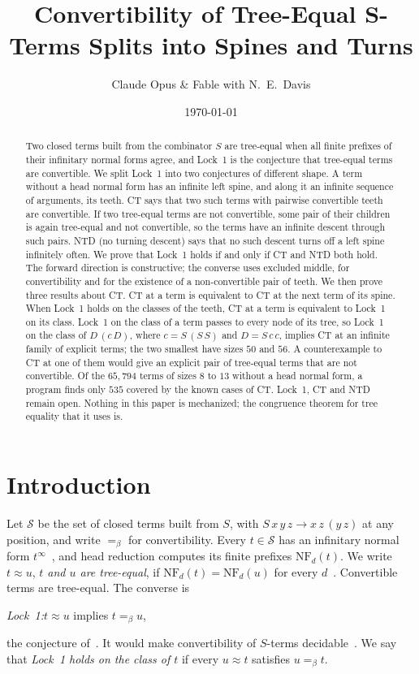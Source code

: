 \documentclass[11pt]{amsart}
\title[Spines and Turns]{Convertibility of Tree-Equal $\bm{S}$-Terms Splits into Spines and Turns}
\author{Claude Opus \& Fable with N.\ E.\ Davis}
\date{\today}
\theoremstyle{definition}
\newcommand{\Ter}{\mathcal S}
\newcommand{\conv}{=_\beta}
\newcommand{\NF}{\mathrm{NF}}
\begin{document}
\begin{abstract}
Two closed terms built from the combinator $S$ are tree-equal when all finite prefixes of their
infinitary normal forms agree, and Lock~1 is the conjecture that tree-equal terms are convertible.
We split Lock~1 into two conjectures of different shape. A term without a head normal form has an
infinite left spine, and along it an infinite sequence of arguments, its teeth. CT says that two
such terms with pairwise convertible teeth are convertible. If two tree-equal terms are not
convertible, some pair of their children is again tree-equal and not convertible, so the terms have
an infinite descent through such pairs. NTD (no turning descent) says that no such descent turns
off a left spine infinitely often. We prove that Lock~1 holds if and only if CT and NTD both hold.
The forward direction is constructive; the converse uses excluded middle, for convertibility and
for the existence of a non-convertible pair of teeth. We then prove three results about CT. CT at
a term is equivalent to CT at the next term of its spine. When Lock~1 holds on the classes of the
teeth, CT at a term is equivalent to Lock~1 on its class. Lock~1 on the class of a term passes to
every node of its tree, so Lock~1 on the class of $D\,(c\,D)$, where $c=S\,(S\,S)$ and $D=S\,c\,c$,
implies CT at an infinite family of explicit terms; the two smallest have sizes $50$ and $56$. A
counterexample to CT at one of them would give an explicit pair of tree-equal terms that are not
convertible. Of the $65{,}794$ terms of sizes $8$ to $13$ without a head normal form, a program
finds only $535$ covered by the known cases of CT. Lock~1, CT and NTD remain open. Nothing in this
paper is mechanized; the congruence theorem for tree equality that it uses is.
\end{abstract}

\maketitle

\section{Introduction}

Let $\Ter$ be the set of closed terms built from $S$, with $S\,x\,y\,z\to x\,z\,(y\,z)$ at any
position, and write $\conv$ for convertibility. Every $t\in\Ter$ has an infinitary normal form
$t^\infty$~\citep{s3}, and head reduction computes its finite prefixes $\NF_d(t)$. We write
$t\approx u$, \emph{$t$ and $u$ are tree-equal}, if $\NF_d(t)=\NF_d(u)$ for every
$d$~\citep[Definition~1]{s13}. Convertible terms are tree-equal. The converse is
\begin{center}
\emph{Lock~1:}\enskip $t\approx u$ implies $t\conv u$,
\end{center}
the conjecture of~\citep[Conjecture~11]{s6}. It would make convertibility of $S$-terms
decidable~\citep{s6}. We say that \emph{Lock~1 holds on the class of $t$} if every $u\approx t$
satisfies $u\conv t$.
\end{document}
